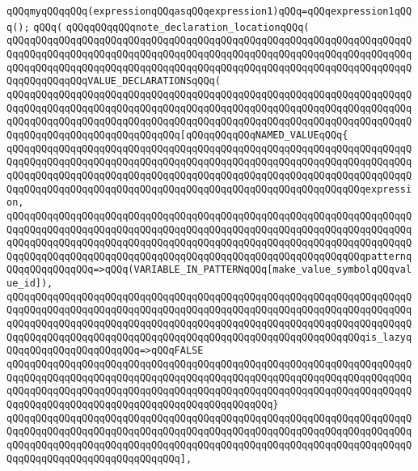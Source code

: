 \verb|qQQqmyqQQqqQQq(expressionqQQqasqQQqexpression1)qQQq=qQQqexpression1qQQq();|\newline
\verb|qQQq(|\newline
\verb|qQQqqQQqqQQqnote_declaration_locationqQQq(|\newline
\verb|qQQqqQQqqQQqqQQqqQQqqQQqqQQqqQQqqQQqqQQqqQQqqQQqqQQqqQQqqQQqqQQqqQQqqQQqqQQqqQQqqQQqqQQqqQQqqQQqqQQqqQQqqQQqqQQqqQQqqQQqqQQqqQQqqQQqqQQqqQQqqQQqqQQqqQQqqQQqqQQqqQQqqQQqqQQqqQQqqQQqqQQqqQQqqQQqqQQqqQQqqQQqqQQqqQQqqQQqqQQqqQQqVALUE_DECLARATIONSqQQq(|\newline
\verb|qQQqqQQqqQQqqQQqqQQqqQQqqQQqqQQqqQQqqQQqqQQqqQQqqQQqqQQqqQQqqQQqqQQqqQQqqQQqqQQqqQQqqQQqqQQqqQQqqQQqqQQqqQQqqQQqqQQqqQQqqQQqqQQqqQQqqQQqqQQqqQQqqQQqqQQqqQQqqQQqqQQqqQQqqQQqqQQqqQQqqQQqqQQqqQQqqQQqqQQqqQQqqQQqqQQqqQQqqQQqqQQqqQQqqQQqqQQqqQQq[qQQqqQQqqQQqNAMED_VALUEqQQq{|\newline
\verb|qQQqqQQqqQQqqQQqqQQqqQQqqQQqqQQqqQQqqQQqqQQqqQQqqQQqqQQqqQQqqQQqqQQqqQQqqQQqqQQqqQQqqQQqqQQqqQQqqQQqqQQqqQQqqQQqqQQqqQQqqQQqqQQqqQQqqQQqqQQqqQQqqQQqqQQqqQQqqQQqqQQqqQQqqQQqqQQqqQQqqQQqqQQqqQQqqQQqqQQqqQQqqQQqqQQqqQQqqQQqqQQqqQQqqQQqqQQqqQQqqQQqqQQqqQQqqQQqqQQqqQQqqQQqqQQqexpression,|\newline
\verb|qQQqqQQqqQQqqQQqqQQqqQQqqQQqqQQqqQQqqQQqqQQqqQQqqQQqqQQqqQQqqQQqqQQqqQQqqQQqqQQqqQQqqQQqqQQqqQQqqQQqqQQqqQQqqQQqqQQqqQQqqQQqqQQqqQQqqQQqqQQqqQQqqQQqqQQqqQQqqQQqqQQqqQQqqQQqqQQqqQQqqQQqqQQqqQQqqQQqqQQqqQQqqQQqqQQqqQQqqQQqqQQqqQQqqQQqqQQqqQQqqQQqqQQqqQQqqQQqqQQqqQQqqQQqqQQqpatternqQQqqQQqqQQqqQQq=>qQQq(VARIABLE_IN_PATTERNqQQq[make_value_symbolqQQqvalue_id]),|\newline
\verb|qQQqqQQqqQQqqQQqqQQqqQQqqQQqqQQqqQQqqQQqqQQqqQQqqQQqqQQqqQQqqQQqqQQqqQQqqQQqqQQqqQQqqQQqqQQqqQQqqQQqqQQqqQQqqQQqqQQqqQQqqQQqqQQqqQQqqQQqqQQqqQQqqQQqqQQqqQQqqQQqqQQqqQQqqQQqqQQqqQQqqQQqqQQqqQQqqQQqqQQqqQQqqQQqqQQqqQQqqQQqqQQqqQQqqQQqqQQqqQQqqQQqqQQqqQQqqQQqqQQqqQQqqQQqqQQqis_lazyqQQqqQQqqQQqqQQqqQQqqQQq=>qQQqFALSE|\newline
\verb|qQQqqQQqqQQqqQQqqQQqqQQqqQQqqQQqqQQqqQQqqQQqqQQqqQQqqQQqqQQqqQQqqQQqqQQqqQQqqQQqqQQqqQQqqQQqqQQqqQQqqQQqqQQqqQQqqQQqqQQqqQQqqQQqqQQqqQQqqQQqqQQqqQQqqQQqqQQqqQQqqQQqqQQqqQQqqQQqqQQqqQQqqQQqqQQqqQQqqQQqqQQqqQQqqQQqqQQqqQQqqQQqqQQqqQQqqQQqqQQqqQQqqQQqqQQqqQQq}|\newline
\verb|qQQqqQQqqQQqqQQqqQQqqQQqqQQqqQQqqQQqqQQqqQQqqQQqqQQqqQQqqQQqqQQqqQQqqQQqqQQqqQQqqQQqqQQqqQQqqQQqqQQqqQQqqQQqqQQqqQQqqQQqqQQqqQQqqQQqqQQqqQQqqQQqqQQqqQQqqQQqqQQqqQQqqQQqqQQqqQQqqQQqqQQqqQQqqQQqqQQqqQQqqQQqqQQqqQQqqQQqqQQqqQQqqQQqqQQqqQQqqQQq],|\newline

